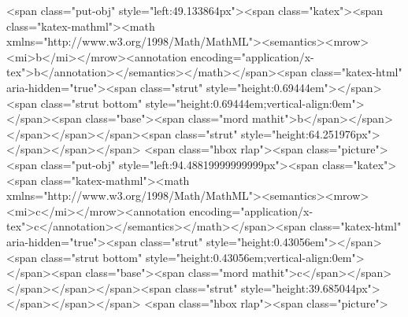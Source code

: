 <span class="put-obj" style="left:49.133864px"><span class="katex"><span class="katex-mathml"><math xmlns="http://www.w3.org/1998/Math/MathML"><semantics><mrow><mi>b</mi></mrow><annotation encoding="application/x-tex">b</annotation></semantics></math></span><span class="katex-html" aria-hidden="true"><span class="strut" style="height:0.69444em"></span><span class="strut bottom" style="height:0.69444em;vertical-align:0em"></span><span class="base"><span class="mord mathit">b</span></span></span></span></span><span class="strut" style="height:64.251976px"></span></span></span> <span class="hbox rlap"><span class="picture">
<span class="put-obj" style="left:94.48819999999999px"><span class="katex"><span class="katex-mathml"><math xmlns="http://www.w3.org/1998/Math/MathML"><semantics><mrow><mi>c</mi></mrow><annotation encoding="application/x-tex">c</annotation></semantics></math></span><span class="katex-html" aria-hidden="true"><span class="strut" style="height:0.43056em"></span><span class="strut bottom" style="height:0.43056em;vertical-align:0em"></span><span class="base"><span class="mord mathit">c</span></span></span></span></span><span class="strut" style="height:39.685044px"></span></span></span> <span class="hbox rlap"><span class="picture">
